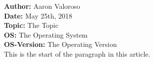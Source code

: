 \documentclass[11pt,a4papper]{article}
\begin{document}
\noindent\textbf{Author: } Aaron Valoroso \\
\textbf{Date: } May 25th, 2018 \\
\textbf{Topic: } The Topic \\
\textbf{OS: } The Operating System \\
\textbf{OS-Version: } The Operating Version \\[1cm]

This is the start of the paragraph in this article.
\end{document}
